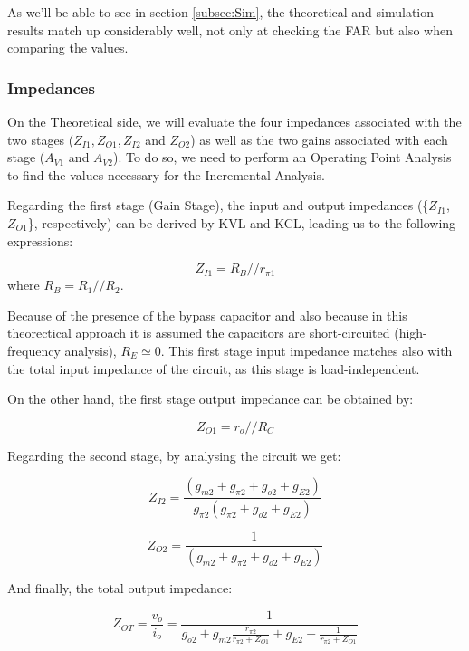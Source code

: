 As we'll be able to see in section \ref{subsec:Sim}, the theoretical and simulation results match up considerably well, not only at checking the FAR but also when comparing the values.


\subsubsection{Impedances}

On the Theoretical side, we will evaluate the four impedances associated with the two stages ($Z_{I1}, Z_{O1}, Z_{I2}$ and $Z_{O2}$) as well as the two gains associated with each stage ($A_{V1}$ and $A_{V2}$).
To do so, we need to perform an Operating Point Analysis to find the values necessary for the Incremental Analysis.

Regarding the first stage (Gain Stage), the input and output impedances (\{$Z_{I1}$, $Z_{O1}$\}, respectively) can be derived by KVL and KCL, leading us to the following expressions:

\begin{equation}
    Z_{I1}=R_B // r_{\pi 1}
\end{equation}
where $R_B=R_1 // R_2$.

Because of the presence of the bypass capacitor and also because in this theorectical approach it is assumed the capacitors are short-circuited (high-frequency analysis), $R_E \simeq 0$. This first stage input impedance matches also with the total input impedance of the circuit, as this stage is load-independent.

On the other hand, the first stage output impedance can be obtained by:

\begin{equation}
    Z_{O1}=r_o // R_C  
\end{equation}

\clearpage

Regarding the second stage, by analysing the circuit we get:

\begin{equation}
    Z_{I2}=\frac{(g_{m2}+g_{\pi2}+g_{o2}+g_{E2})}{g_{\pi2}(g_{\pi2}+g_{o2}+g_{E2})}
\end{equation}

\begin{equation}
    Z_{O2}=\frac{1}{(g_{m2}+g_{\pi2}+g_{o2}+g_{E2})}
\end{equation}

And finally, the total output impedance:

\begin{equation}
    Z_{OT}=\frac{v_o}{i_o}=\frac{1}{g_{o2}+g_{m2}\frac{r_{\pi2}}{r_{\pi2}+Z_{O1}}+g_{E2}+\frac{1}{r_{\pi2}+Z_{O1}}}
\end{equation}

